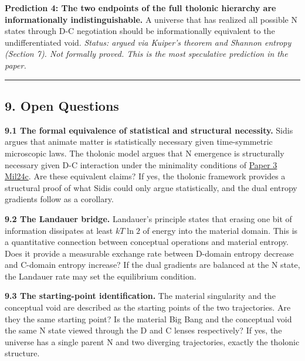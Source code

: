\documentclass[
  11pt,
  letterpaper,
]{article}
\begin{document}
\textbf{Prediction 4: The two endpoints of the full tholonic hierarchy
are informationally indistinguishable.} A universe that has realized all
possible N states through D-C negotiation should be informationally
equivalent to the undifferentiated void. \emph{Status: argued via
Kuiper's theorem and Shannon entropy (Section 7). Not formally proved.
This is the most speculative prediction in the paper.}

\begin{center}\rule{0.5\linewidth}{0.5pt}\end{center}

\subsection{9. Open Questions}\label{open-questions}

\textbf{9.1 The formal equivalence of statistical and structural
necessity.} Sidis argues that animate matter is statistically necessary
given time-symmetric microscopic laws. The tholonic model argues that N
emergence is structurally necessary given D-C interaction under the
minimality conditions of
\href{https://github.com/baardev/truevalue/blob/main/docnav/Research/papers/3_minimal-recursive-triadic-framework/3_minimal-recursive-triadic-framework.pdf}{Paper
3}
\href{https://github.com/baardev/truevalue/blob/main/docnav/Research/papers/3_minimal-recursive-triadic-framework/3_minimal-recursive-triadic-framework.pdf}{Mil24c}.
Are these equivalent claims? If yes, the tholonic framework provides a
structural proof of what Sidis could only argue statistically, and the
dual entropy gradients follow as a corollary.

\textbf{9.2 The Landauer bridge.} Landauer's principle states that
erasing one bit of information dissipates at least \(kT \ln 2\) of
energy into the material domain. This is a quantitative connection
between conceptual operations and material entropy. Does it provide a
measurable exchange rate between D-domain entropy decrease and C-domain
entropy increase? If the dual gradients are balanced at the N state, the
Landauer rate may set the equilibrium condition.

\textbf{9.3 The starting-point identification.} The material singularity
and the conceptual void are described as the starting points of the two
trajectories. Are they the same starting point? Is the material Big Bang
and the conceptual void the same N state viewed through the D and C
lenses respectively? If yes, the universe has a single parent N and two
diverging trajectories, exactly the tholonic structure.
\end{document}
